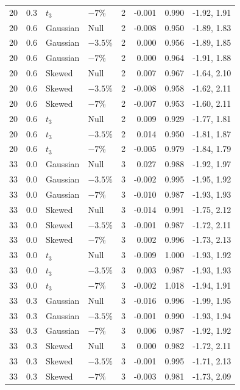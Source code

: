 \begin{longtable}{rrllrrrr}
20 & 0.3 & $t_3$ & $-7\%$ & 2 & -0.001 & 0.990 & -1.92, 1.91 \\
20 & 0.6 & Gaussian & Null & 2 & -0.008 & 0.950 & -1.89, 1.83 \\
20 & 0.6 & Gaussian & $-3.5\%$ & 2 & 0.000 & 0.956 & -1.89, 1.85 \\
20 & 0.6 & Gaussian & $-7\%$ & 2 & 0.000 & 0.964 & -1.91, 1.88 \\
20 & 0.6 & Skewed & Null & 2 & 0.007 & 0.967 & -1.64, 2.10 \\
20 & 0.6 & Skewed & $-3.5\%$ & 2 & -0.008 & 0.958 & -1.62, 2.11 \\
20 & 0.6 & Skewed & $-7\%$ & 2 & -0.007 & 0.953 & -1.60, 2.11 \\
20 & 0.6 & $t_3$ & Null & 2 & 0.009 & 0.929 & -1.77, 1.81 \\
20 & 0.6 & $t_3$ & $-3.5\%$ & 2 & 0.014 & 0.950 & -1.81, 1.87 \\
20 & 0.6 & $t_3$ & $-7\%$ & 2 & -0.005 & 0.979 & -1.84, 1.79 \\
33 & 0.0 & Gaussian & Null & 3 & 0.027 & 0.988 & -1.92, 1.97 \\
33 & 0.0 & Gaussian & $-3.5\%$ & 3 & -0.002 & 0.995 & -1.95, 1.92 \\
33 & 0.0 & Gaussian & $-7\%$ & 3 & -0.010 & 0.987 & -1.93, 1.93 \\
33 & 0.0 & Skewed & Null & 3 & -0.014 & 0.991 & -1.75, 2.12 \\
33 & 0.0 & Skewed & $-3.5\%$ & 3 & -0.001 & 0.987 & -1.72, 2.11 \\
33 & 0.0 & Skewed & $-7\%$ & 3 & 0.002 & 0.996 & -1.73, 2.13 \\
33 & 0.0 & $t_3$ & Null & 3 & -0.009 & 1.000 & -1.93, 1.92 \\
33 & 0.0 & $t_3$ & $-3.5\%$ & 3 & 0.003 & 0.987 & -1.93, 1.93 \\
33 & 0.0 & $t_3$ & $-7\%$ & 3 & -0.002 & 1.018 & -1.94, 1.91 \\
33 & 0.3 & Gaussian & Null & 3 & -0.016 & 0.996 & -1.99, 1.95 \\
33 & 0.3 & Gaussian & $-3.5\%$ & 3 & -0.001 & 0.990 & -1.93, 1.94 \\
33 & 0.3 & Gaussian & $-7\%$ & 3 & 0.006 & 0.987 & -1.92, 1.92 \\
33 & 0.3 & Skewed & Null & 3 & 0.000 & 0.982 & -1.72, 2.11 \\
33 & 0.3 & Skewed & $-3.5\%$ & 3 & -0.001 & 0.995 & -1.71, 2.13 \\
33 & 0.3 & Skewed & $-7\%$ & 3 & -0.003 & 0.981 & -1.73, 2.09 \\

\end{longtable}
